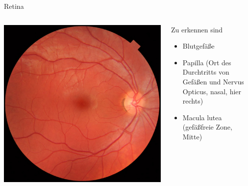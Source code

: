 \documentclass{beamer}
\begin{document}

\begin{frame}{Retina}
    

    \begin{columns}[c]
    
    \begin{column}{5cm}
    \begin{center}
        \includegraphics[width=\textwidth]{Fundus_photograph_of_normal_right_eye.jpg}
    \end{center}
    
    \end{column}


    \begin{column}{5cm}
Zu erkennen sind \pause \\
\begin{itemize}
    \item 
    Blutgefäße 
    \item
    Papilla (Ort des Durchtritts von Gefäßen und Nervus Opticus, nasal, hier rechts)
    \item
    Macula lutea (gefäßfreie Zone, Mitte)
\end{itemize}
    \end{column}
    
    \end{columns}

\end{frame}    
    
\end{document}
